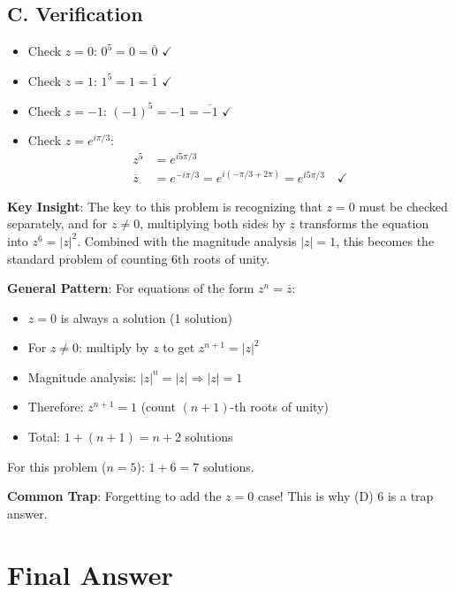 \documentclass[11pt]{article}
\begin{document}
\begin{solutionbox}
\subsection*{C. Verification}
\begin{itemize}[leftmargin=*]
    \item Check $z = 0$: $0^5 = 0 = \overline{0}$ $\checkmark$
    \item Check $z = 1$: $1^5 = 1 = \overline{1}$ $\checkmark$
    \item Check $z = -1$: $(-1)^5 = -1 = \overline{-1}$ $\checkmark$
    \item Check $z = e^{i\pi/3}$: 
    \begin{align*}
    z^5 &= e^{i5\pi/3}\\
    \overline{z} &= e^{-i\pi/3} = e^{i(-\pi/3 + 2\pi)} = e^{i5\pi/3} \quad \checkmark
    \end{align*}
\end{itemize}
\end{solutionbox}

\begin{keyinsightbox}
\textbf{Key Insight}: The key to this problem is recognizing that $z = 0$ must be checked separately, and for $z \neq 0$, multiplying both sides by $z$ transforms the equation into $z^6 = |z|^2$. Combined with the magnitude analysis $|z| = 1$, this becomes the standard problem of counting 6th roots of unity.

\textbf{General Pattern}: For equations of the form $z^n = \overline{z}$:
\begin{itemize}
    \item $z = 0$ is always a solution (1 solution)
    \item For $z \neq 0$: multiply by $z$ to get $z^{n+1} = |z|^2$
    \item Magnitude analysis: $|z|^n = |z| \Rightarrow |z| = 1$
    \item Therefore: $z^{n+1} = 1$ (count $(n+1)$-th roots of unity)
    \item Total: $1 + (n+1) = n+2$ solutions
\end{itemize}

For this problem ($n = 5$): $1 + 6 = 7$ solutions.

\textbf{Common Trap}: Forgetting to add the $z = 0$ case! This is why (D) 6 is a trap answer.
\end{keyinsightbox}

\section*{Final Answer}
\end{document}
